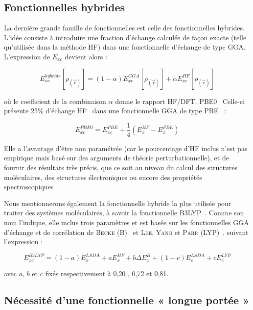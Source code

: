 \subsection{Fonctionnelles hybrides}

La dernière grande famille de fonctionnelles est celle des fonctionnelles hybrides. L’idée consiste à introduire une fraction d’échange calculée de façon exacte (telle qu’utilisée dans la méthode HF) dans une fonctionnelle d’échange de type GGA. L’expression de $E_{xc}$ devient alors :

\begin{equation}
E_{xc}^{hybride}[\rho_{(\vec{r})}] = (1- \alpha) E_{xc}^{GGA}[\rho_{(\vec{r})}] + \alpha E_{xc}^{HF}[\rho_{(\vec{r})}]
\end{equation}

\noindent où le coefficient de la combinaison $\alpha$ donne le rapport HF/DFT.
PBE0~\cite{adamo1999toward} Celle-ci présente 25\% d’échange HF~\cite{adamo1997toward} dans une fonctionnelle GGA de type PBE~\cite{perdew1996generalized} :

\begin{equation}
E_{xc}^{PBE0} = E_{xc}^{PBE} + \frac{1}{4} (E_{x}^{HF} - E_{x}^{PBE})
\end{equation}

Elle a l’avantage d’être non paramétrée (car le pourcentage d’HF inclus n’est pas empirique mais basé sur des arguments de théorie perturbationnelle), et de fournir des résultats très précis, que ce soit au niveau du calcul des structures moléculaires, des structures électroniques ou encore des propriétés spectroscopiques~\cite{pbe0}.

Nous mentionnerons également la fonctionnelle hybride la plus utilisée pour traiter des systèmes moléculaires, à savoir la fonctionnelle B3LYP~\cite{Bcxthermo}. Comme son nom l’indique, elle inclus trois paramètres et est basée sur les fonctionnelles GGA d’échange et de corrélation de \textsc{Becke} (B)~\cite{B88} et \textsc{Lee}, \textsc{Yang} et \textsc{Parr} (LYP)~\cite{lyp}, suivant l’expression :

\begin{equation}
E_{xc}^{B3LYP} = (1-a) E_{x}^{LSDA} + a E_{x}^{HF} + b \Delta E_{x}^{B} + (1-c) E_{c}^{LSDA} + c E_{c}^{LYP}
\label{B3LYP}
\end{equation}

\noindent avec $a$, $b$ et $c$ fixés respectivement à 0,20 , 0,72 et 0,81.


\subsection{Nécessité d'une fonctionnelle « longue portée »}

